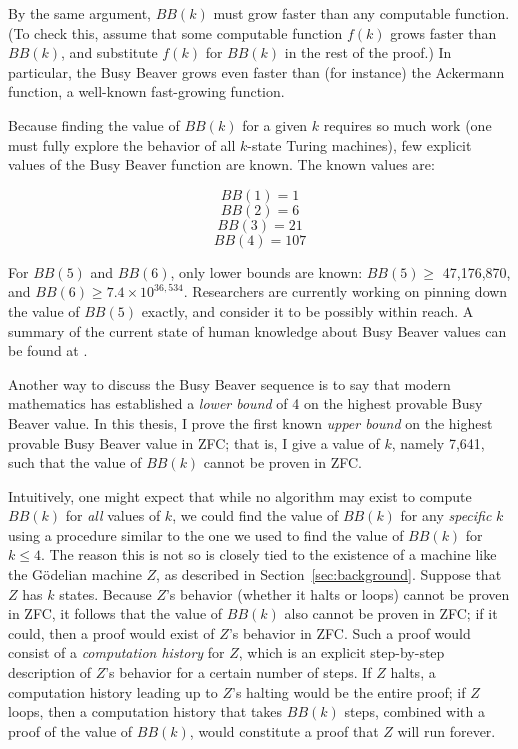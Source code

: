 \documentclass[11pt]{article}
\newcommand{\statenumcomma}{7,641, }
\begin{document}
By the same argument, $BB(k)$ must grow faster than any computable function. (To check this, assume that some computable function $f(k)$ grows faster than $BB(k)$, and substitute $f(k)$ for $BB(k)$ in the rest of the proof.) In particular, the Busy Beaver grows even faster than (for instance) the Ackermann function, a well-known fast-growing function. 

Because finding the value of $BB(k)$ for a given $k$ requires so much work (one must fully explore the behavior of all $k$-state Turing machines), few explicit values of the Busy Beaver function are known. The known values are: 

$$BB(1) = 1$$
$$BB(2) = 6$$
$$BB(3) = 21$$
$$BB(4) = 107$$

For $BB(5)$ and $BB(6)$, only lower bounds are known: $BB(5) \ge$ 47,176,870, and $BB(6) \ge 7.4 \times 10^{36,534}$. Researchers are currently working on pinning down the value of $BB(5)$ exactly, and consider it to be possibly within reach. A summary of the current state of human knowledge about Busy Beaver values can be found at \cite{bbvalues}.


Another way to discuss the Busy Beaver sequence is to say that modern mathematics has established a \emph{lower bound} of 4 on the highest provable Busy Beaver value. In this thesis, I prove the first known \emph{upper bound} on the highest provable Busy Beaver value in ZFC; that is, I give a value of $k$, namely \statenumcomma such that the value of $BB(k)$ cannot be proven in ZFC. 

Intuitively, one might expect that while no algorithm may exist to compute $BB(k)$ for \emph{all} values of $k$, we could find the value of $BB(k)$ for any \emph{specific} $k$ using a procedure similar to the one we used to find the value of $BB(k)$ for $k \le 4$. The reason this is not so is closely tied to the existence of a machine like the G\"{o}delian machine $Z$, as described in Section~\ref{sec:background}. Suppose that $Z$ has $k$ states. Because $Z$'s behavior (whether it halts or loops) cannot be proven in ZFC, it follows that the value of $BB(k)$ also cannot be proven in ZFC; if it could, then a proof would exist of $Z$'s behavior in ZFC. Such a proof would consist of a \emph{computation history} for $Z$, which is an explicit step-by-step description of $Z$'s behavior for a certain number of steps. If $Z$ halts, a computation history leading up to $Z$'s halting would be the entire proof; if $Z$ loops, then a computation history that takes $BB(k)$ steps, combined with a proof of the value of $BB(k)$, would constitute a proof that $Z$ will run forever. 
\end{document}
